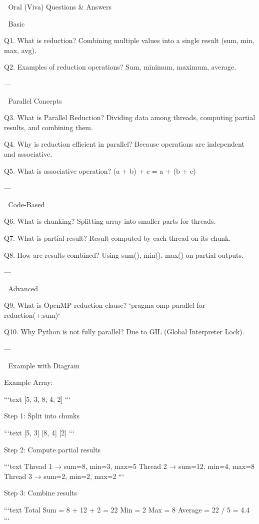 🎯 Oral (Viva) Questions & Answers

 🔹 Basic

Q1. What is reduction?
Combining multiple values into a single result (sum, min, max, avg).

Q2. Examples of reduction operations?
Sum, minimum, maximum, average.

---

 🔹 Parallel Concepts

Q3. What is Parallel Reduction?
Dividing data among threads, computing partial results, and combining them.

Q4. Why is reduction efficient in parallel?
Because operations are independent and associative.

Q5. What is associative operation?
(a + b) + c = a + (b + c)

---

 🔹 Code-Based

Q6. What is chunking?
Splitting array into smaller parts for threads.

Q7. What is partial result?
Result computed by each thread on its chunk.

Q8. How are results combined?
Using sum(), min(), max() on partial outputs.

---

 🔹 Advanced

Q9. What is OpenMP reduction clause?
`pragma omp parallel for reduction(+:sum)`

Q10. Why Python is not fully parallel?
Due to GIL (Global Interpreter Lock).

---

 🔢 Example with Diagram

 Example Array:

```text
[5, 3, 8, 4, 2]
```

 Step 1: Split into chunks

```text
[5, 3]   [8, 4]   [2]
```

 Step 2: Compute partial results

```text
Thread 1 → sum=8, min=3, max=5
Thread 2 → sum=12, min=4, max=8
Thread 3 → sum=2, min=2, max=2
```

 Step 3: Combine results

```text
Total Sum = 8 + 12 + 2 = 22
Min = 2
Max = 8
Average = 22 / 5 = 4.4
```

